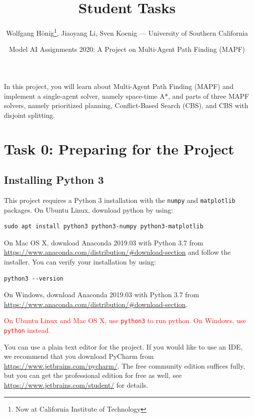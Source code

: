 \documentclass[11pt]{article}
\begin{document}
\title{Student Tasks}
\author{Wolfgang Hönig\footnote{Now at California Institute of Technology}, Jiaoyang Li, Sven Koenig --- University of Southern California}
\date{Model AI Assignments 2020: A Project on Multi-Agent Path Finding (MAPF)}

\maketitle

In this project, you will learn about Multi-Agent Path Finding (MAPF) and implement a single-agent solver, namely space-time A*, and parts of three MAPF solvers, namely prioritized planning, Conflict-Based Search (CBS), and CBS with disjoint splitting.

\section{Task 0: Preparing for the Project}

\subsection{Installing Python 3}

This project requires a Python 3 installation with the \texttt{numpy} and \texttt{matplotlib} packages. On Ubuntu Linux, download python by using:

\begin{verbatim}
sudo apt install python3 python3-numpy python3-matplotlib
\end{verbatim}

On Mac OS X, download Anaconda 2019.03 with Python 3.7 from \url{https://www.anaconda.com/distribution/#download-section} and follow the installer. You can verify your installation by using:

\begin{verbatim}
python3 --version
\end{verbatim}

On Windows, download Anaconda 2019.03 with Python 3.7 from \url{https://www.anaconda.com/distribution/#download-section}. 

\textcolor{red}{On Ubuntu Linux and Mac OS X, use \texttt{python3} to run python. On Windows, use \texttt{python} instead.}

You can use a plain text editor for the project. If you would like to use an IDE, we recommend that you download PyCharm from \url{https://www.jetbrains.com/pycharm/}. The free community edition suffices fully, but you can get the professional edition for free as well, see \url{https://www.jetbrains.com/student/} for details.
\end{document}
